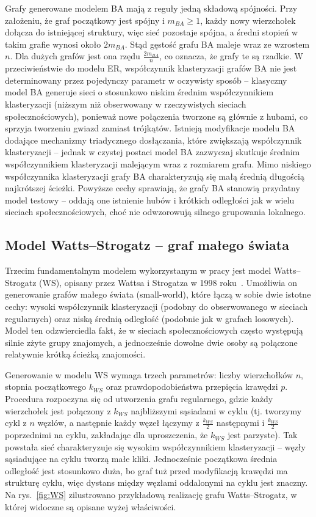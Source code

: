 Grafy generowane modelem BA mają z reguły jedną składową spójności. Przy założeniu, że graf początkowy jest spójny i $m_{BA} \ge 1$, każdy nowy wierzchołek dołącza do istniejącej struktury, więc sieć pozostaje spójna, a średni stopień w takim grafie wynosi około $2m_{BA}$. Stąd gęstość grafu BA maleje wraz ze wzrostem $n$. Dla dużych grafów jest ona rzędu $\frac{2m_{BA}}{n}$, co oznacza, że grafy te są rzadkie. W przeciwieństwie do modelu ER, współczynnik klasteryzacji grafów BA nie jest determinowany przez pojedynczy parametr w oczywisty sposób -- klasyczny model BA generuje sieci o stosunkowo niskim średnim współczynnikiem klasteryzacji (niższym niż obserwowany w rzeczywistych sieciach społecznościowych), ponieważ nowe połączenia tworzone są głównie z hubami, co sprzyja tworzeniu gwiazd zamiast trójkątów. Istnieją modyfikacje modelu BA dodające mechanizmy triadycznego dosłączania, które zwiększają współczynnik klasteryzacji -- jednak w czystej postaci model BA zazwyczaj skutkuje średnim współczynnikiem klasteryzacji malejącym wraz z rozmiarem grafu. Mimo niskiego współczynnika klasteryzacji grafy BA charakteryzują się małą średnią długością najkrótszej ścieżki. Powyższe cechy sprawiają, że grafy BA stanowią przydatny model testowy -- oddają one istnienie hubów i krótkich odległości jak w wielu sieciach społecznościowych, choć nie odwzorowują silnego grupowania lokalnego.

\subsection{Model Watts--Strogatz -- graf małego świata}
Trzecim fundamentalnym modelem wykorzystanym w pracy jest model Watts--Strogatz (WS), opisany przez Wattsa i Strogatza w 1998 roku~\cite{Watts1998}. Umożliwia on generowanie grafów małego świata (small-world), które łączą w sobie dwie istotne cechy: wysoki współczynnik klasteryzacji (podobny do obserwowanego w sieciach regularnych) oraz niską średnią odległość (podobnie jak w grafach losowych). Model ten odzwierciedla fakt, że w sieciach społecznościowych często występują silnie zżyte grupy znajomych, a jednocześnie dowolne dwie osoby są połączone relatywnie krótką ścieżką znajomości.

Generowanie w modelu WS wymaga trzech parametrów: liczby wierzchołków $n$, stopnia początkowego $k_{WS}$ oraz prawdopodobieństwa przepięcia krawędzi $p$. Procedura rozpoczyna się od utworzenia grafu regularnego, gdzie każdy wierzchołek jest połączony z $k_{WS}$ najbliższymi sąsiadami w cyklu (tj. tworzymy cykl z $n$ węzłów, a następnie każdy węzeł łączymy z $\frac{k_{WS}}{2}$ następnymi i $\frac{k_{WS}}{2}$ poprzednimi na cyklu, zakładając dla uproszczenia, że $k_{WS}$ jest parzyste). Tak powstała sieć charakteryzuje się wysokim współczynnikiem klasteryzacji -- węzły sąsiadujące na cyklu tworzą małe kliki.
Jednocześnie początkowa średnia odległość jest stosunkowo duża, bo graf tuż przed modyfikacją krawędzi ma strukturę cyklu, więc dystans między węzłami oddalonymi na cyklu jest znaczny. Na rys.~\ref{fig:WS} zilustrowano przykładową realizację grafu Watts--Strogatz, w której widoczne są opisane wyżej właściwości.

